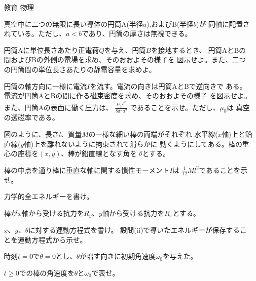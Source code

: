 \documentclass[fleqn]{jbook}
\begin{document}
\begin{question}{教育 物理}{}


\begin{subquestions}
\SubQuestion
  真空中に二つの無限に長い導体の円筒A(半径$a$),およびB(半径$b$)が
  同軸に配置されている。ただし、$a<b$であり、円筒の厚さは無視できる。

  \begin{subsubquestions}
  \SubSubQuestion
    円筒Aに単位長さあたり正電荷$Q$を与え、円筒$B$を接地するとき、
    円筒AとBの間およびBの外側の電場を求め、そのおおよその様子を
    図示せよ。また、二つの円筒間の単位長さあたりの静電容量を求めよ。

  \SubSubQuestion
    円筒の軸方向に一様に電流$I$を流す。電流の向きは円筒AとBで逆向きで
    ある。電流が円筒AとBの間に作る磁束密度を求め、そのおおよその様子
    を図示せよ。また、円筒Aの表面に働く圧力は、
    $\frac{\mu_0I^2}{8\pi^2a^2}$ であることを示せ。ただし、$\mu_0$は
    真空の透磁率である。

  \end{subsubquestions}


\SubQuestion
  図のように、長さ$l$、質量$M$の一様な細い棒の両端がそれぞれ
  水平線($x$軸)上と鉛直線($y$軸)上を離れないように拘束されて滑らかに
  動くようにしてある。棒の重心の座標を$(x,y)$、棒が鉛直線となす角を
  $\theta$とする。\\
%
  \parbox[t]{95mm}{
  \begin{subsubquestions}
  \SubSubQuestion
    棒の中点を通り棒に垂直な軸に関する慣性モーメント$I$は
    $\frac{1}{12}Ml^2$であることを示せ。

  \SubSubQuestion
    力学的全エネルギーを書け。

  \vspace*{2mm}\hspace{-2zw}棒が$x$軸から受ける抗力を$R_y$、$y$軸から受ける抗力を$R_x$とする。

  \SubSubQuestion
    $x$、$y$、$\theta$に対する運動方程式を書け。
  \SubSubQuestion
    設問(ii)で導いたエネルギーが保存することを運動方程式から示せ。

  \vspace*{2mm}\hspace{-2zw}時刻$t=0$で$\theta=0$とし、$\theta$が増す向きに初期角速度$\omega_0$を与えた。

  \SubSubQuestion
    $t\geq 0$での棒の角速度を$\theta$と$\omega_0$で表せ。


\end{subsubquestions}}
\end{subquestions}
\end{question}
\end{document}
